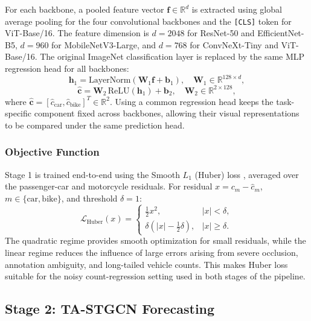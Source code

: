 \documentclass[preprint,12pt]{elsarticle}
\begin{document}
For each backbone, a pooled feature vector $\mathbf{f} \in \mathbb{R}^{d}$ is extracted using global average pooling for the four convolutional backbones and the \texttt{[CLS]} token for ViT-Base/16. The feature dimension is $d=2048$ for ResNet-50 and EfficientNet-B5, $d=960$ for MobileNetV3-Large, and $d=768$ for ConvNeXt-Tiny and ViT-Base/16. The original ImageNet classification layer is replaced by the same MLP regression head for all backbones:
\begin{equation}
\mathbf{h}_1 = \text{LayerNorm}\left(\mathbf{W}_1\mathbf{f}+\mathbf{b}_1\right),
\quad \mathbf{W}_1 \in \mathbb{R}^{128 \times d},
\end{equation}
\begin{equation}
\hat{\mathbf{c}}
=
\mathbf{W}_2\,\text{ReLU}(\mathbf{h}_1)+\mathbf{b}_2,
\quad \mathbf{W}_2 \in \mathbb{R}^{2 \times 128},
\end{equation}
where $\hat{\mathbf{c}}=[\hat{c}_{\text{car}},\hat{c}_{\text{bike}}]^T \in \mathbb{R}^{2}$. Using a common regression head keeps the task-specific component fixed across backbones, allowing their visual representations to be compared under the same prediction head.

\subsubsection{Objective Function}

Stage 1 is trained end-to-end using the Smooth $L_1$ (Huber) loss \citep{huber}, averaged over the passenger-car and motorcycle residuals. For residual $x=c_m-\hat{c}_m$, $m\in\{\text{car},\text{bike}\}$, and threshold $\delta=1$:
\begin{equation}
\mathcal{L}_{\mathrm{Huber}}(x)=
\begin{cases}
\frac{1}{2}x^2, & |x|<\delta,\\
\delta\left(|x|-\frac{1}{2}\delta\right), & |x|\ge\delta.
\end{cases}
\end{equation}
The quadratic regime provides smooth optimization for small residuals, while the linear regime reduces the influence of large errors arising from severe occlusion, annotation ambiguity, and long-tailed vehicle counts. This makes Huber loss suitable for the noisy count-regression setting used in both stages of the pipeline.


\subsection{Stage 2: TA-STGCN Forecasting}
\label{sec:graph_tastgcn}
\end{document}
